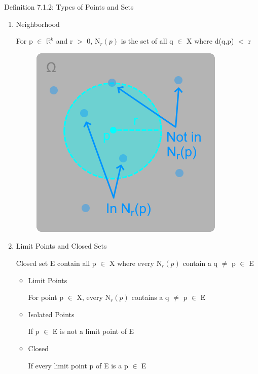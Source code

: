 { \color{blue} Definition 7.1.2: Types of Points and Sets } 
	\begin{enumerate}[label=(\alph*), leftmargin=2cm, itemsep=0.1cm]
		\item {\color{lblue} Neighborhood}

			\qquad For p $\in$ $\mathbb{R}^k$ and r $>$ 0, N$_r(p)$ is the set of all q $\in$ X
			where d(q,p) $<$ r

			\begin{figure}[h]
				\centering
				\includegraphics[scale=0.45]{Images/7.1.2a.png}
			\end{figure}

		\item {\color{lblue} Limit Points and Closed Sets}

			\hspace{0.1cm} Closed set E contain all p $\in$ X where every N$_r(p)$ contain
			a q $\neq$ p $\in$ E

			\begin{itemize}[leftmargin=1cm, itemsep=0.1cm]
				\item Limit Points 

					\qquad For point p $\in$ X, every N$_r(p)$ contains a
					q $\neq$ p $\in$ E
				
				\item Isolated Points

					\qquad If p $\in$ E is not a limit point of E

				\item Closed

					\qquad If every limit point p of E is a p $\in$ E
			\end{itemize}


\end{enumerate}
